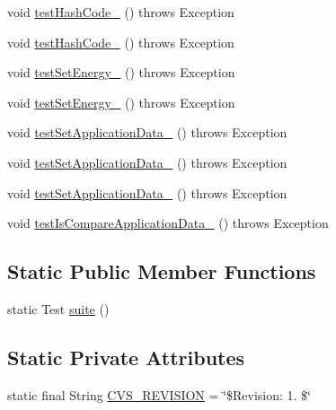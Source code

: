 \begin{DoxyCompactItemize}
\item 
void \hyperlink{classorg_1_1jgap_1_1_base_gene_test_af4e1dca49bf17b54149dcde4c25df007}{test\-Hash\-Code\-\_} ()  throws Exception 
\item 
void \hyperlink{classorg_1_1jgap_1_1_base_gene_test_a7cacd1fb9a9279cd4f747a9db827c7c0}{test\-Hash\-Code\-\_} ()  throws Exception 
\item 
void \hyperlink{classorg_1_1jgap_1_1_base_gene_test_a114e42c4580104520d13d7b15aebdc34}{test\-Set\-Energy\-\_} ()  throws Exception 
\item 
void \hyperlink{classorg_1_1jgap_1_1_base_gene_test_a17325d21cc9a65fe7e8e49f4d6d3b04e}{test\-Set\-Energy\-\_} ()  throws Exception 
\item 
void \hyperlink{classorg_1_1jgap_1_1_base_gene_test_af0253799ad5bf1f0f586c3b767afab10}{test\-Set\-Application\-Data\-\_} ()  throws Exception 
\item 
void \hyperlink{classorg_1_1jgap_1_1_base_gene_test_a00bdb1c53bcf6d47c9ad16fec5a52de3}{test\-Set\-Application\-Data\-\_} ()  throws Exception 
\item 
void \hyperlink{classorg_1_1jgap_1_1_base_gene_test_ab2cd872d724507f006962aecc05830f6}{test\-Set\-Application\-Data\-\_} ()  throws Exception 
\item 
void \hyperlink{classorg_1_1jgap_1_1_base_gene_test_ad1e4dea7bc733738ded517705bf5b6be}{test\-Is\-Compare\-Application\-Data\-\_} ()  throws Exception 
\end{DoxyCompactItemize}
\subsection*{Static Public Member Functions}
\begin{DoxyCompactItemize}
\item 
static Test \hyperlink{classorg_1_1jgap_1_1_base_gene_test_a844331adc01c1d874a86ba1a0663e26d}{suite} ()
\end{DoxyCompactItemize}
\subsection*{Static Private Attributes}
\begin{DoxyCompactItemize}
\item 
static final String \hyperlink{classorg_1_1jgap_1_1_base_gene_test_aa6ac0a1de88c8143bfd3fb4174a09427}{C\-V\-S\-\_\-\-R\-E\-V\-I\-S\-I\-O\-N} = \char`\"{}\$Revision\-: 1. \$\char`\"{}
\end{DoxyCompactItemize}
